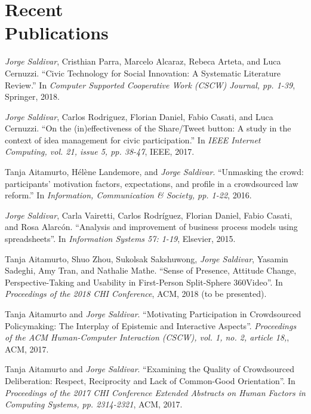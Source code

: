 
\section{Recent\\Publications}


\textit{Jorge Saldivar}, Cristhian Parra, Marcelo Alcaraz, Rebeca Arteta, and Luca Cernuzzi. ``Civic Technology for Social Innovation: A Systematic Literature Review.'' In \textit{Computer Supported Cooperative Work (CSCW) Journal, pp. 1-39}, Springer, 2018.

\textit{Jorge Saldivar}, Carlos Rodriguez, Florian Daniel, Fabio Casati, and Luca Cernuzzi. ``On the (in)effectiveness of the Share/Tweet button: A study in the context of idea management for civic participation.'' In \textit{IEEE Internet Computing, vol. 21, issue 5, pp. 38-47}, IEEE, 2017.

Tanja Aitamurto, Hélène Landemore, and \textit{Jorge Saldivar}. ``Unmasking the crowd: participants’ motivation factors, expectations, and profile in a crowdsourced law reform.'' In \textit{Information, Communication \& Society, pp. 1-22}, 2016.

\textit{Jorge Saldivar}, Carla Vairetti, Carlos Rodríguez, Florian Daniel, Fabio Casati, and Rosa Alarcón. ``Analysis and improvement of business process models using spreadsheets''. In \textit{Information Systems 57: 1-19}, Elsevier, 2015.


Tanja Aitamurto, Shuo Zhou, Sukolsak Sakshuwong, \textit{Jorge Saldivar}, Yasamin Sadeghi, Amy Tran, and Nathalie Mathe. ``Sense of Presence, Attitude Change, Perspective-Taking and Usability in First-Person Split-Sphere 360\degree Video''. In \textit{Proceedings of the 2018 CHI Conference}, ACM, 2018 (to be presented).

Tanja Aitamurto and \textit{Jorge Saldivar}. ``Motivating Participation in Crowdsourced Policymaking: The Interplay of Epistemic and Interactive Aspects''. \textit{Proceedings of the ACM Human-Computer Interaction (CSCW), vol. 1, no. 2, article 18,}, ACM, 2017.

Tanja Aitamurto and \textit{Jorge Saldivar}. ``Examining the Quality of Crowdsourced Deliberation: Respect, Reciprocity and Lack of Common-Good Orientation''. In \textit{Proceedings of the 2017 CHI Conference Extended Abstracts on Human Factors in Computing Systems, pp. 2314-2321}, ACM, 2017.

